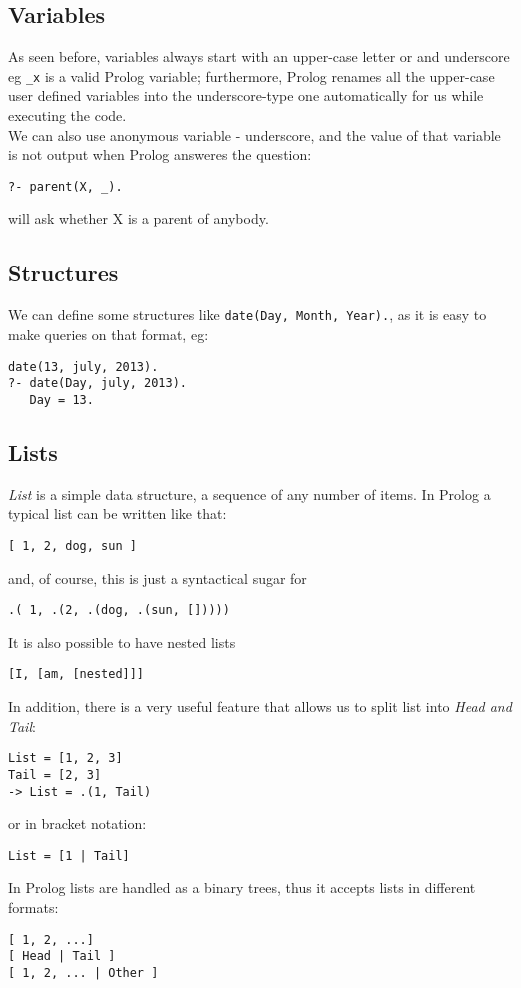 \documentclass[11pt]{article}
\begin{document}
\subsection{Variables}
As seen before, variables always start with an upper-case letter or and underscore eg \texttt{\_x} is a valid Prolog variable; furthermore, Prolog renames all the upper-case user defined variables into the underscore-type one automatically for us while executing the code.\\
We can also use anonymous variable - underscore, and the value of that variable is not output when Prolog answeres the question:
\begin{lstlisting}
?- parent(X, _).
\end{lstlisting}
will ask whether X is a parent of anybody.

\subsection{Structures}
We can define some structures like \texttt{date(Day, Month, Year).}, as it is easy to make queries on that format, eg:
\begin{lstlisting}
date(13, july, 2013).
?- date(Day, july, 2013).
   Day = 13.
\end{lstlisting}

\subsection{Lists}
\emph{List} is a simple data structure, a sequence of any number of items. In Prolog a typical list can be written like that: 
\begin{lstlisting}
[ 1, 2, dog, sun ]
\end{lstlisting}
and, of course, this is just a syntactical sugar for 
\begin{lstlisting}
.( 1, .(2, .(dog, .(sun, []))))
\end{lstlisting} 
It is also possible to have nested lists
\begin{lstlisting}
[I, [am, [nested]]]
\end{lstlisting}
In addition, there is a very useful feature that allows us to split list into \emph{Head and Tail}:
\begin{lstlisting}
List = [1, 2, 3]
Tail = [2, 3]
-> List = .(1, Tail)
\end{lstlisting}
or in bracket notation:
\begin{lstlisting}
List = [1 | Tail]
\end{lstlisting}
In Prolog lists are handled as a binary trees, thus it accepts lists in different formats:
\begin{lstlisting}
[ 1, 2, ...]
[ Head | Tail ]
[ 1, 2, ... | Other ]
\end{lstlisting}
\end{document}
